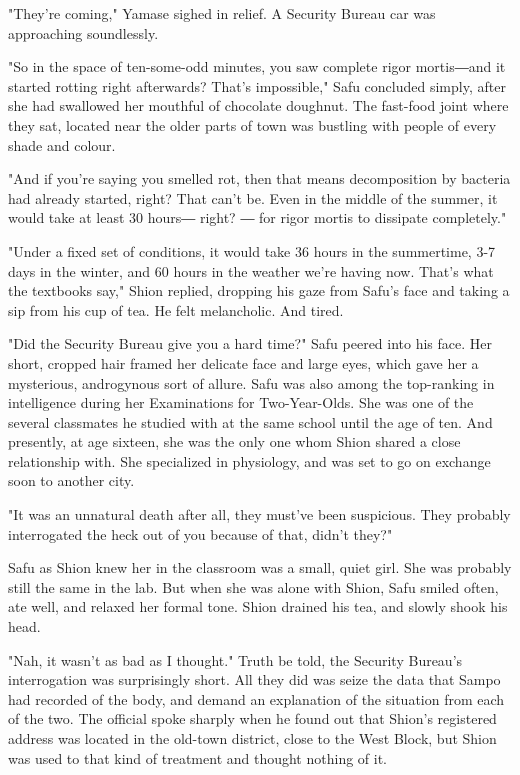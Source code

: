 "They're coming," Yamase sighed in relief. A Security Bureau car was
approaching soundlessly.

\myspace

"So in the space of ten-some-odd minutes, you saw complete rigor
mortis―and it started rotting right afterwards? That's impossible," Safu
concluded simply, after she had swallowed her mouthful of chocolate
doughnut. The fast-food joint where they sat, located near the older
parts of town was bustling with people of every shade and colour.

"And if you're saying you smelled rot, then that means decomposition by
bacteria had already started, right? That can't be. Even in the middle
of the summer, it would take at least 30 hours― right? ― for rigor
mortis to dissipate completely."

"Under a fixed set of conditions, it would take 36 hours in the
summertime, 3-7 days in the winter, and 60 hours in the weather we're
having now. That's what the textbooks say," Shion replied, dropping his
gaze from Safu's face and taking a sip from his cup of tea. He felt
melancholic. And tired.

"Did the Security Bureau give you a hard time?" Safu peered into his
face. Her short, cropped hair framed her delicate face and large eyes,
which gave her a mysterious, androgynous sort of allure. Safu was also
among the top-ranking in intelligence during her Examinations for
Two-Year-Olds. She was one of the several classmates he studied with at
the same school until the age of ten. And presently, at age sixteen, she
was the only one whom Shion shared a close relationship with. She
specialized in physiology, and was set to go on exchange soon to another
city.

"It was an unnatural death after all, they must've been suspicious. They
probably interrogated the heck out of you because of that, didn't they?"

Safu as Shion knew her in the classroom was a small, quiet girl. She was
probably still the same in the lab. But when she was alone with Shion,
Safu smiled often, ate well, and relaxed her formal tone. Shion drained
his tea, and slowly shook his head.

"Nah, it wasn't as bad as I thought." Truth be told, the Security
Bureau's interrogation was surprisingly short. All they did was seize
the data that Sampo had recorded of the body, and demand an explanation
of the situation from each of the two. The official spoke sharply when
he found out that Shion's registered address was located in the old-town
district, close to the West Block, but Shion was used to that kind of
treatment and thought nothing of it.

